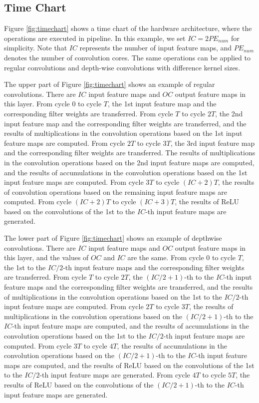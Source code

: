 \documentclass[runningheads]{llncs}
\begin{document}
\subsection{Time Chart}
\label{subsec:timechart}

Figure \ref{fig:timechart} shows a time chart of the hardware architecture, where the operations are executed in pipeline. In this example, we set $IC = 2PE_{num}$ for simplicity. Note that $IC$ represents the number of input feature maps, and $PE_{num}$ denotes the number of convolution cores. The same operations can be applied to regular convolutions and depth-wise convolutions with difference kernel sizes.

The upper part of Figure \ref{fig:timechart} shows an example of regular convolutions. There are $IC$ input feature maps and $OC$ output feature maps in this layer. From cycle 0 to cycle $T$, the 1st input feature map and the corresponding filter weights are transferred. From cycle $T$ to cycle $2T$, the 2nd input feature map and the corresponding filter weights are transferred, and the results of multiplications in the convolution operations based on the 1st input feature maps are computed. From cycle $2T$ to cycle $3T$, the 3rd input feature map and the corresponding filter weights are transferred. The results of multiplications in the convolution operations based on the 2nd input feature maps are computed, and the results of accumulations in the convolution operations based on the 1st input feature maps are computed. From cycle $3T$ to cycle $(IC+2)T$, the results of convolution operations based on the remaining input feature maps are computed. From cycle $(IC+2)T$ to cycle $(IC+3)T$, the results of ReLU based on the convolutions of the 1st to the $IC$-th input feature maps are generated. 

The lower part of Figure \ref{fig:timechart} shows an example of depthwise convolutions. There are $IC$ input feature maps and $OC$ output feature maps in this layer, and the values of $OC$ and $IC$ are the same. From cycle 0 to cycle $T$, the 1st to the $IC/2$-th input feature maps and the corresponding filter weights are transferred. From cycle $T$ to cycle $2T$, the $(IC/2+1)$-th to the $IC$-th input feature maps and the corresponding filter weights are transferred, and the results of multiplications in the convolution operations based on the 1st to the $IC/2$-th input feature maps are computed. From cycle $2T$ to cycle $3T$, the results of multiplications in the convolution operations based on the $(IC/2+1)$-th to the $IC$-th input feature maps are computed, and the results of accumulations in the convolution operations based on the 1st to the $IC/2$-th input feature maps are computed. From cycle $3T$ to cycle $4T$, the results of accumulations in the convolution operations based on the $(IC/2+1)$-th to the $IC$-th input feature maps are computed, and the results of ReLU based on the convolutions of the 1st to the $IC/2$-th input feature maps are generated. From cycle $4T$ to cycle $5T$, the results of ReLU based on the convolutions of the $(IC/2+1)$-th to the $IC$-th input feature maps are generated. 
\end{document}
